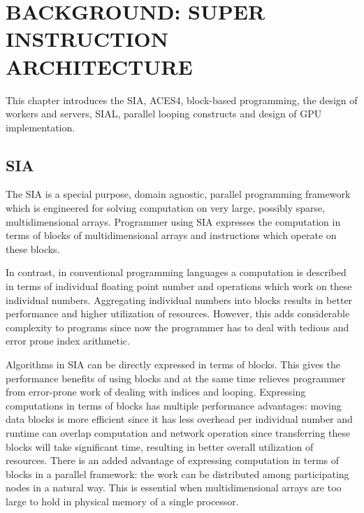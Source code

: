 \chapter{BACKGROUND: SUPER INSTRUCTION ARCHITECTURE} \label{background}

This chapter introduces the SIA, ACES4, block-based
programming, the design of workers and servers, SIAL, parallel looping constructs
and design of GPU implementation.

\section{SIA}
The SIA is a special purpose, domain agnostic, parallel programming framework which
is engineered for solving computation on very large, possibly sparse, multidimensional
arrays. Programmer using SIA expresses the computation in terms of blocks of multidimensional arrays
and instructions which operate on these blocks.

In contrast, in conventional programming languages a computation is described in terms of individual floating point
number and operations which work on these individual numbers. Aggregating
individual numbers into blocks results in better performance and higher utilization
of resources. However, this adds considerable complexity to programs since now
the programmer has to deal with tedious and error prone index arithmetic.

Algorithms in SIA can be directly expressed in terms of
blocks. This gives the performance benefits of using blocks and at the same time relieves
programmer from error-prone work of dealing with indices and looping. Expressing
computations in terms of blocks has multiple performance advantages: moving data
blocks is more efficient since it has less overhead per individual number
and runtime can overlap computation and network operation since transferring these
blocks will take significant time, resulting in better overall utilization of resources.
There is an added advantage of expressing computation in terms of blocks in a parallel
framework: the work can be distributed among participating nodes in a natural
way. This is essential when multidimensional arrays are too large to hold in
physical memory of a single processor.

